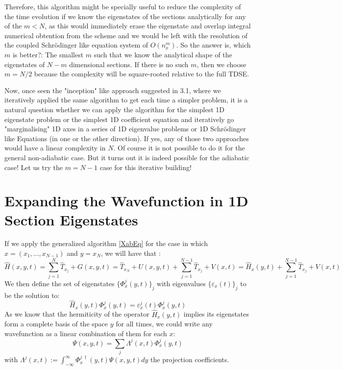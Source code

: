 \documentclass[11pt, a4paper]{article} %
\begin{document}
Therefore, this algorithm might be specially useful to reduce the complexity of the time evolution if we know the eigenstates of the sections analytically for any of the $m<N$, as this would immediately erase the eigenstate and overlap integral numerical obtention from the scheme and we would be left with the resolution of the coupled Schrödinger like equation system of $O(n_x^{m})$. So the answer is, which $m$ is better?: The smallest $m$ such that we know the analytical shape of the eigenstates of $N-m$ dimensional sections. If there is no such $m$, then we choose $m=N/2$ because the complexity will be square-rooted relative to the full TDSE.

Now, once seen the "inception" like approach suggested in 3.1, where we iteratively applied the same algorithm to get each time a simpler problem, it is a natural question whether we can apply the algorithm for the simplest 1D eigenstate problem or the simplest 1D coefficient equation and iteratively go "marginalising" 1D axes in a series of 1D eigenvalue problems or 1D Schrödinger like Equations (in one or the other direction). If yes, any of those two approaches would have a linear complexity in $N$. Of course it is not possible to do it for the general non-adiabatic case. But it turns out it is indeed possible for the adiabatic case! Let us try the $m=N-1$ case for this iterative building!

\newpage

\section{Expanding the Wavefunction in 1D Section Eigenstates}
If we apply the generalized algorithm \eqref{XabEq} for the case in which $x=(x_1,...,x_{N-1})$ and $y=x_N$, we will have that :
\begin{equation}
\hat{H}(x, y, t)= \sum_{j=1}^{N}\hat{T}_{x_j}+G(x, y, t)=\hat{T}_{x_N}+U(x, y, t)+\sum_{j=1}^{N-1}\hat{T}_{x_j}+V(x,t) = \hat{H}_x(y,t)+\sum_{j=1}^{N-1}\hat{T}_{x_j}+V(x,t)
\end{equation}
We then define the set of eigenstates $\{\Phi^j_x(y,t)\}_j$ with eigenvalues $\{\varepsilon_x(t)\}_j$ to be the solution to:
\begin{equation}
\hat{H}_x(y,t)\Phi^j_x(y,t)=\varepsilon^j_x(t)\Phi^j_x(y,t)
\end{equation}
As we know that the hermiticity of the operator $\hat{H}_x(y,t)$ implies its eigenstates form a complete basis of the space $y$ for all times, we could write any wavefunction as a linear combination of them for each $x$:
\begin{equation}
\Psi(x,y,t)=\sum_j \Lambda^j(x,t) \Phi^j_x(y,t)
\end{equation}
with $\Lambda^j(x,t):= \int_{-\infty}^{\infty}\Phi^{j\ \dagger}_x(y,t) \Psi(x,y,t)dy$ the projection coefficients.
\end{document}
